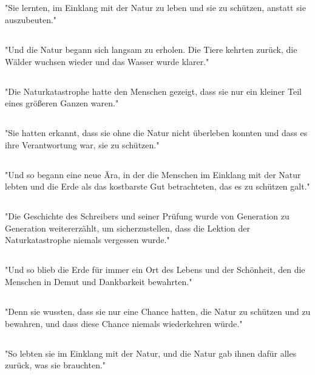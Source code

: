 \documentclass{article}
\begin{document}
\subsection{}
"Sie lernten, im Einklang mit der Natur zu leben und sie zu schützen, anstatt sie auszubeuten."
\subsection{}
"Und die Natur begann sich langsam zu erholen. Die Tiere kehrten zurück, die Wälder wuchsen wieder und das Wasser wurde klarer."
\subsection{}
"Die Naturkatastrophe hatte den Menschen gezeigt, dass sie nur ein kleiner Teil eines größeren Ganzen waren."
\subsection{}
"Sie hatten erkannt, dass sie ohne die Natur nicht überleben konnten und dass es ihre Verantwortung war, sie zu schützen."
\subsection{}
"Und so begann eine neue Ära, in der die Menschen im Einklang mit der Natur lebten und die Erde als das kostbarste Gut betrachteten, das es zu schützen galt."
\subsection{}
"Die Geschichte des Schreibers und seiner Prüfung wurde von Generation zu Generation weitererzählt, um sicherzustellen, dass die Lektion der Naturkatastrophe niemals vergessen wurde."
\subsection{}
"Und so blieb die Erde für immer ein Ort des Lebens und der Schönheit, den die Menschen in Demut und Dankbarkeit bewahrten."
\subsection{}
"Denn sie wussten, dass sie nur eine Chance hatten, die Natur zu schützen und zu bewahren, und dass diese Chance niemals wiederkehren würde."
\subsection{}
"So lebten sie im Einklang mit der Natur, und die Natur gab ihnen dafür alles zurück, was sie brauchten."
\end{document}
